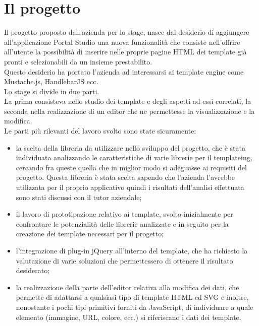 \section{Il progetto}
Il progetto proposto dall'azienda per lo stage, nasce dal desiderio di aggiungere all'applicazione Portal Studio una nuova funzionalità che consiste nell'offrire all'utente la possibilità di inserire nelle proprie pagine HTML dei template già pronti e selezionabili da un insieme prestabilito.\\
Questo desiderio ha portato l'azienda ad interessarsi ai template engine come Mustache.js, HandlebarJS ecc.\\
Lo stage si divide in due parti.\\
La prima consisteva nello studio dei template e degli aspetti ad essi correlati, la seconda nella realizzazione di un editor che ne permettesse la visualizzazione e la modifica.\\
Le parti più rilevanti del lavoro svolto sono state sicuramente:
\begin{itemize}
	\item la scelta della libreria da utilizzare nello sviluppo del progetto, che è stata individuata analizzando le caratteristiche di varie librerie per il templateing, cercando fra queste quella che in miglior modo si adeguasse ai requisiti del progetto.
	Questa libreria è stata scelta sapendo che l'azienda l'avrebbe utilizzata per il proprio applicativo quindi i risultati dell'analisi effettuata sono stati discussi con il tutor aziendale;
	
	\item il lavoro di prototipazione relativo ai template, svolto inizialmente per confrontare le potenzialità delle librerie analizzate e in seguito per la creazione dei template necessari per il progetto;
	
	\item l'integrazione di plug-in jQuery all'interno del template, che ha richiesto la valutazione di varie soluzioni che permettessero di ottenere il risultato desiderato;
	
	\item la realizzazione della parte dell'editor relativa alla modifica dei dati, che permette di adattarsi a qualsiasi tipo di template HTML ed SVG e inoltre, nonostante i pochi tipi primitivi forniti da JavaScript, di individuare a quale elemento (immagine, URL, colore, ecc.) si riferiscano i dati dei template.
	  
\end{itemize}
